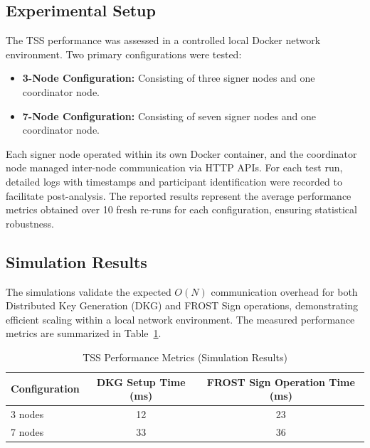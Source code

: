 \documentclass{DESSThesis}
\begin{document}
\subsection{Experimental Setup}
The TSS performance was assessed in a controlled local Docker network environment. Two primary configurations were tested:
\begin{itemize}
    \item \textbf{3-Node Configuration:} Consisting of three signer nodes and one coordinator node.
    \item \textbf{7-Node Configuration:} Consisting of seven signer nodes and one coordinator node.
\end{itemize}
Each signer node operated within its own Docker container, and the coordinator node managed inter-node communication via HTTP APIs. For each test run, detailed logs with timestamps and participant identification were recorded to facilitate post-analysis. The reported results represent the average performance metrics obtained over 10 fresh re-runs for each configuration, ensuring statistical robustness.

\subsection{Simulation Results}
The simulations validate the expected $O(N)$ communication overhead for both Distributed Key Generation (DKG) and FROST Sign operations, demonstrating efficient scaling within a local network environment. The measured performance metrics are summarized in Table~\ref{tab:tss_performance}.

\begin{table}[h!]
\caption{TSS Performance Metrics (Simulation Results)}
\label{tab:tss_performance}
\centering
\begin{tabular}{|l|c|c|}
\hline
\textbf{Configuration} & \textbf{DKG Setup Time (ms)} & \textbf{FROST Sign Operation Time (ms)} \\
\hline
3 nodes & 12 & 23 \\
\hline
7 nodes & 33 & 36 \\
\hline
\end{tabular}
\end{table}
\end{document}
